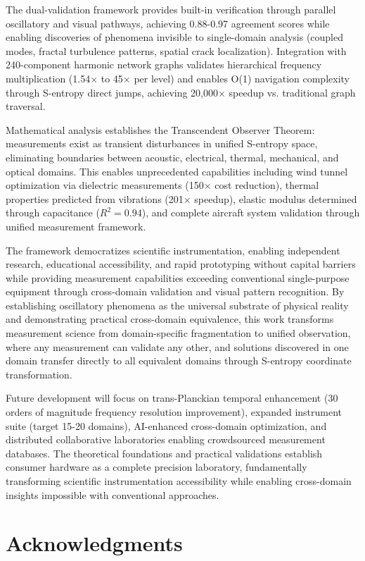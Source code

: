 \documentclass[12pt,a4paper]{article}
\begin{document}
{{{{{{{{{{{{{{{{{\begin{algorithm}
{{{{{{{{{The dual-validation framework provides built-in verification through parallel oscillatory and visual pathways, achieving 0.88-0.97 agreement scores while enabling discoveries of phenomena invisible to single-domain analysis (coupled modes, fractal turbulence patterns, spatial crack localization). Integration with 240-component harmonic network graphs validates hierarchical frequency multiplication (1.54× to 45× per level) and enables O(1) navigation complexity through S-entropy direct jumps, achieving 20,000× speedup vs. traditional graph traversal.

Mathematical analysis establishes the Transcendent Observer Theorem: measurements exist as transient disturbances in unified S-entropy space, eliminating boundaries between acoustic, electrical, thermal, mechanical, and optical domains. This enables unprecedented capabilities including wind tunnel optimization via dielectric measurements (150× cost reduction), thermal properties predicted from vibrations (201× speedup), elastic modulus determined through capacitance ($R^2 = 0.94$), and complete aircraft system validation through unified measurement framework.

The framework democratizes scientific instrumentation, enabling independent research, educational accessibility, and rapid prototyping without capital barriers while providing measurement capabilities exceeding conventional single-purpose equipment through cross-domain validation and visual pattern recognition. By establishing oscillatory phenomena as the universal substrate of physical reality and demonstrating practical cross-domain equivalence, this work transforms measurement science from domain-specific fragmentation to unified observation, where any measurement can validate any other, and solutions discovered in one domain transfer directly to all equivalent domains through S-entropy coordinate transformation.

Future development will focus on trans-Planckian temporal enhancement (30 orders of magnitude frequency resolution improvement), expanded instrument suite (target 15-20 domains), AI-enhanced cross-domain optimization, and distributed collaborative laboratories enabling crowdsourced measurement databases. The theoretical foundations and practical validations establish consumer hardware as a complete precision laboratory, fundamentally transforming scientific instrumentation accessibility while enabling cross-domain insights impossible with conventional approaches.

\section{Acknowledgments}

}}}}}}}}}
\end{algorithm}}}}}}}}}}}}}}}}}}
\end{document}
